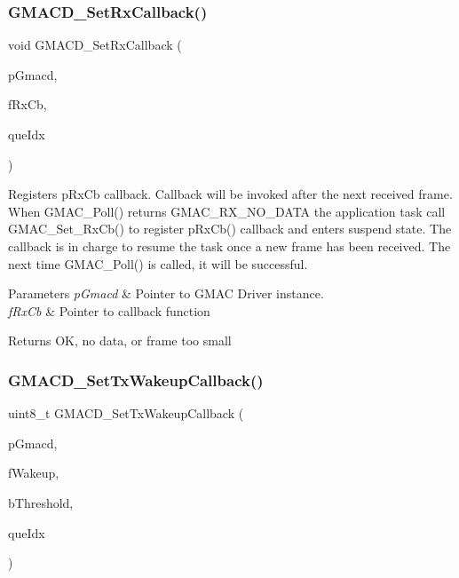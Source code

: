 \subsubsection{\texorpdfstring{GMACD\_SetRxCallback()}{GMACD\_SetRxCallback()}}
{\footnotesize\ttfamily void G\+M\+A\+C\+D\+\_\+\+Set\+Rx\+Callback (\begin{DoxyParamCaption}\item[{\mbox{\hyperlink{group__gmacd__types_gaa8760917079000a5ee7fbc7fab992dd3}{s\+Gmacd}} $\ast$}]{p\+Gmacd,  }\item[{\mbox{\hyperlink{group__gmacd__types_ga64979042bf43f697de166e864e3259de}{f\+Gmacd\+Transfer\+Callback}}}]{f\+Rx\+Cb,  }\item[{gmac\+Que\+List\+\_\+t}]{que\+Idx }\end{DoxyParamCaption})}



Registers p\+Rx\+Cb callback. Callback will be invoked after the next received frame. When G\+M\+A\+C\+\_\+\+Poll() returns G\+M\+A\+C\+\_\+\+R\+X\+\_\+\+N\+O\+\_\+\+D\+A\+TA the application task call G\+M\+A\+C\+\_\+\+Set\+\_\+\+Rx\+Cb() to register p\+Rx\+Cb() callback and enters suspend state. The callback is in charge to resume the task once a new frame has been received. The next time G\+M\+A\+C\+\_\+\+Poll() is called, it will be successful. 


\begin{DoxyParams}{Parameters}
{\em p\+Gmacd} & Pointer to G\+M\+AC Driver instance. \\
\hline
{\em f\+Rx\+Cb} & Pointer to callback function \\
\hline
\end{DoxyParams}
\begin{DoxyReturn}{Returns}
OK, no data, or frame too small 
\end{DoxyReturn}
\mbox{\label{group__gmacd__defines_ga0806a8a23ffb3180d3404ec6d7fbfa1d}} 
\subsubsection{\texorpdfstring{GMACD\_SetTxWakeupCallback()}{GMACD\_SetTxWakeupCallback()}}
{\footnotesize\ttfamily uint8\+\_\+t G\+M\+A\+C\+D\+\_\+\+Set\+Tx\+Wakeup\+Callback (\begin{DoxyParamCaption}\item[{\mbox{\hyperlink{group__gmacd__types_gaa8760917079000a5ee7fbc7fab992dd3}{s\+Gmacd}} $\ast$}]{p\+Gmacd,  }\item[{\mbox{\hyperlink{group__gmacd__types_ga44e6be4bb53db0660baf6cb50b20a684}{f\+Gmacd\+Wakeup\+Callback}}}]{f\+Wakeup,  }\item[{uint8\+\_\+t}]{b\+Threshold,  }\item[{gmac\+Que\+List\+\_\+t}]{que\+Idx }\end{DoxyParamCaption})}

